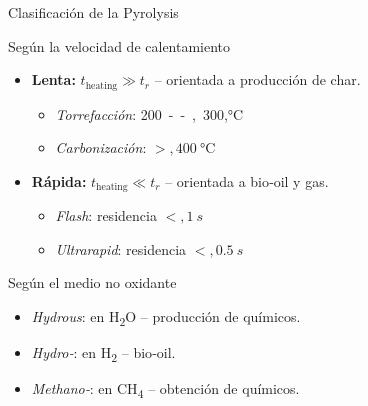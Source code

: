\documentclass[../../main.tex]{subfiles}
\begin{document}
\begin{frame}{Clasificación de la Pyrolysis}
\begin{block}{Según la velocidad de calentamiento}
\begin{itemize}
\item \textbf{Lenta:} $t_{\text{heating}} \gg t_{r}$ – orientada a producción de char.
\begin{itemize}
\item \emph{Torrefacción}: \SI{200}{--,300},\si{\degreeCelsius}
\item \emph{Carbonización}: $>,\SI{400}{\degreeCelsius}$
\end{itemize}
\item \textbf{Rápida:} $t_{\text{heating}} \ll t_{r}$ – orientada a bio‑oil y gas.
\begin{itemize}
\item \emph{Flash}: residencia $<,\SI{1}{s}$
\item \emph{Ultrarapid}: residencia $<,\SI{0.5}{s}$
\end{itemize}
\end{itemize}
\end{block}
\vspace{0.5em}
\begin{block}{Según el medio no oxidante}
\begin{itemize}
\item \emph{Hydrous}: en H\textsubscript{2}O – producción de químicos.
\item \emph{Hydro‑}: en H\textsubscript{2} – bio‑oil.
\item \emph{Methano‑}: en CH\textsubscript{4} – obtención de químicos.
\end{itemize}
\end{block}
\end{frame}
\end{document}
